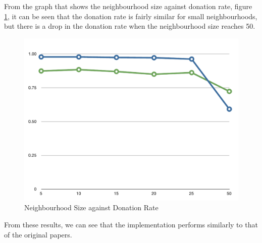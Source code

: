 From the graph that shows the neighbourhood size against donation rate, figure \ref{fig:testing_neighbourhood_size}, it can be seen that the donation rate is fairly similar for small neighbourhoods, but there is a drop in the donation rate when the neighbourhood size reaches 50.

\begin{figure}[htbp]
	\centering
	\includegraphics[width=0.4\linewidth]{img/testing_neighbourhood_size.pdf}
	\caption{Neighbourhood Size against Donation Rate}
	\label{fig:testing_neighbourhood_size}
\end{figure}

From these results, we can see that the implementation performs similarly to that of the original papers.